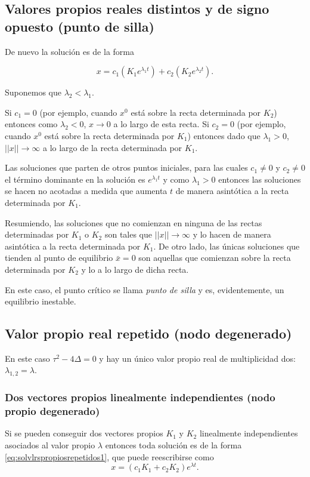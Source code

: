 \subsection{Valores propios reales distintos y de signo opuesto (punto de silla)}

De nuevo la solución es de la forma

$$ x = c_1(K_1 e^{\lambda_1 t}) + c_2(K_2 e^{\lambda_2 t}). $$

Suponemos que $\lambda_2 < \lambda_1$.

Si $c_1 = 0$ (por ejemplo, cuando $x^0$ está sobre la recta determinada por $K_2$) entonces como $\lambda_2 < 0$, $x \to 0$ a lo largo de esta recta.
Si $c_2 = 0$ (por ejemplo, cuando $x^0$ está sobre la recta determinada por $K_1$) entonces dado que $\lambda_1 >0$, $||x|| \to \infty$ a lo largo de la recta determinada por $K_1$.

Las soluciones que parten de otros puntos iniciales, para las cuales $c_1 \neq 0$ y $c_2 \neq 0$ el término dominante en la solución es $e^{\lambda_1 t}$ y como $\lambda_1 > 0$ entonces las soluciones se hacen no acotadas a medida que aumenta $t$ de manera asintótica a la recta determinada por $K_1$.

Resumiendo, las soluciones que no comienzan en ninguna de las rectas determinadas por $K_1$ o $K_2$ son tales que $||x|| \to \infty$ y lo hacen de manera asintótica a la recta determinada por $K_1$. De otro lado, las únicas soluciones que tienden al punto de equilibrio $\bar{x} = 0$ son aquellas que comienzan sobre la recta determinada por $K_2$ y lo a lo largo de dicha recta.

En este caso, el punto crítico se llama \emph{punto de silla} y es, evidentemente, un equilibrio inestable.

\subsection{Valor propio real repetido (nodo degenerado)}

En este caso $\tau^2 - 4\Delta = 0$ y hay un único valor propio real de multiplicidad dos: $\lambda_{1,2} = \lambda$.

\subsubsection{Dos vectores propios linealmente independientes (nodo propio degenerado)}

Si se pueden conseguir dos vectores propios $K_1$ y $K_2$ linealmente independientes asociados al valor propio $\lambda$ entonces toda solución es de la forma \ref{eq:solvlrspropiosrepetidos1}, que puede reescribirse como
$$ x = (c_1K_1 + c_2K_2)e^{\lambda t}.$$

